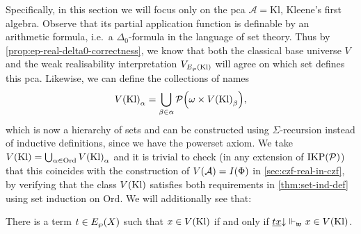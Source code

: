\documentclass[12pt,openany]{book}
\theoremstyle{plain}
\theoremstyle{definition}
\newcommand\Pow{\mathcal{P}}
\newcommand\IKPP{\mathrm{IKP}\mleft(\Pow\mright)}
\newcommand\Ord{\mathrm{Ord}}
\newcommand\Kl{\mathrm{Kl}}
\begin{document}
Specifically, in this section we will focus only on the pca $\mathcal{A} = \Kl$, Kleene's first algebra. Observe that its partial application function is definable by an arithmetic formula, i.e.\ a $\Delta_0$-formula in the language of set theory. Thus by \autoref{prop:ep-real-delta0-correctness}, we know that both the classical base universe $V$ and the weak realisability interpretation $V_{E_\wp\mleft(\Kl\mright)}$ will agree on which set defines this pca. Likewise, we can define the collections of names
\[V\mleft(\Kl\mright)_\alpha = \bigcup_{\beta \in \alpha} \Pow\mleft(\omega \times V\mleft(\Kl\mright)_\beta\mright),\]
which is now a hierarchy of sets and can be constructed using $\Sigma$-recursion instead of inductive definitions, since we have the powerset axiom. We take $V\mleft(\Kl\mright) = \bigcup_{\alpha \in \Ord} V\mleft(\Kl\mright)_\alpha$ and it is trivial to check (in any extension of $\IKPP$) that this coincides with the construction of $V\mleft(\mathcal{A}\mright) = I\mleft(\Phi\mright)$ in \autoref{sec:czf-real-in-czf}, by verifying that the class $V\mleft(\Kl\mright)$ satisfies both requirements in \autoref{thm:set-ind-def} using set induction on $\Ord$. We will additionally see that:
\begin{lemma}
  \label{lem:ep-real-v-kl-agree}
  There is a term $t \in E_\wp\mleft(X\mright)$ such that $x \in V\mleft(\Kl\mright)$ if and only if $\underline{tx} {\downarrow} \Vdash_\mathfrak{w} x \in V\mleft(\Kl\mright)$.
\end{lemma}
\end{document}
